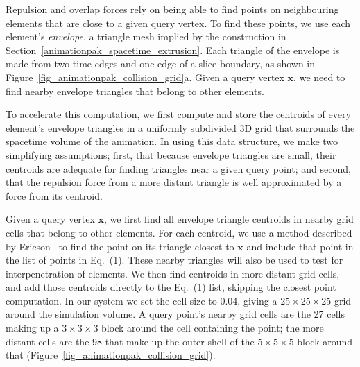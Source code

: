 Repulsion and overlap forces rely on being able to find points on
neighbouring elements that are close to a given query vertex.
To find these points, we use each element's
\textit{envelope}, a triangle mesh implied by the construction in
Section~\ref{animationpak_spacetime_extrusion}.  Each triangle of the envelope 
is made from two time edges and one edge of a slice boundary, as
shown in Figure~\ref{fig_animationpak_collision_grid}a.  Given a query vertex 
$\bm{x}$, we need to find nearby envelope triangles that belong to
other elements.

To accelerate this computation, we first compute and store the centroids of
every element's envelope triangles in a uniformly subdivided 3D grid that
surrounds the spacetime volume of the animation.  In using this data
structure, we make two simplifying assumptions; first, that because 
envelope triangles are small, their centroids
are adequate for finding triangles near a given query point; and second,
that the repulsion force from a more distant triangle is well approximated
by a force from its centroid.

Given a query vertex $\bm{x}$, we first find all envelope triangle
centroids in nearby grid cells that belong to other elements.  For each 
centroid, we use a method described by Ericson~\cite{Ericson2005} to
find the point on its triangle closest to $\bm{x}$ and
include that point in the list of points in Eq.~(1).  These
nearby triangles will also be used to test for interpenetration of elements.
We then find centroids in more distant grid cells, and add
those centroids directly to the Eq.~(1) list, skipping the closest point computation.
In our system we set the cell size to 0.04, giving a $25\times 25\times 25$
grid around the simulation volume.  A query point's nearby grid cells 
are the 27 cells making up a $3\times 3\times 3$ block around the cell 
containing the point; the more distant cells are the 98 that make up the
outer shell of the $5\times 5\times 5$ block around that 
(Figure~\ref{fig_animationpak_collision_grid}).


